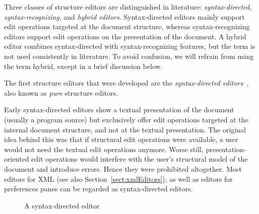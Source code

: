 Three classes of structure editors are distinguished in literature: {\em syntax-directed}, {\em syntax-recognizing}, and {\em hybrid editors}. Syntax-directed editors mainly support edit operations targeted at the document structure, whereas syntax-recognizing editors support edit operations on the presentation of the document. A hybrid editor combines syntax-directed with syntax-recognizing features, but the term is not used consistently in literature. To avoid confusion, we will refrain from using the term hybrid, except in a brief discussion below.


The first structure editors that were developed are the {\em syntax-directed editors}~\cite{reps84synGen,Bahlke86PSG,magnusson90orm}, also known as {\em pure} structure editors. 

Early syntax-directed editors show a textual presentation of the document (usually a program source) but exclusively offer edit operations targeted at the internal document structure, and not at the textual presentation. The original idea behind this was that if structural edit operations were available, a user would not need the textual edit operations anymore. Worse still, presentation-oriented edit operations would interfere with the user's structural model of the document and introduce errors. Hence they were prohibited altogether. Most editors for XML (see also Section~\ref{sect:xmlEditors}), as well as editors for preferences panes can be regarded as syntax-directed editors.

\begin{figure}
\begin{small}
\begin{center}
\begin{center}
\begin{small}
\noindent {}
\end{small}
\end{center}\caption{A syntax-directed editor}\label{synDirEdit} 
\end{center}
\end{small}
\end{figure}


